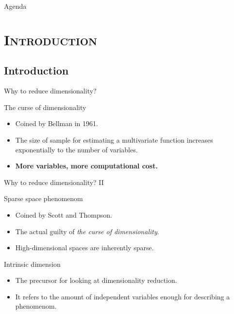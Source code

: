 \documentclass[xcolor=x11names,compress,10pt]{beamer}
\renewcommand{\(}{\begin{columns}}
\renewcommand{\)}{\end{columns}}
\newcommand{\<}[1]{\begin{column}{#1}}
\renewcommand{\>}{\end{column}}
\begin{document}

\begin{frame}{Agenda}
\tableofcontents
\end{frame}


\section{\scshape Introduction}
\subsection{Introduction}
\begin{frame}{Why to reduce dimensionality?}
\begin{block}{The curse of dimensionality}
\begin{itemize}
	\item Coined by Bellman in 1961.
	\item The size of sample for estimating a multivariate function increases exponentially to the number of variables.
	\item \textbf{More variables, more computational cost.}
\end{itemize}
\end{block}

\end{frame}
\begin{frame}{Why to reduce dimensionality? II}
\begin{block}{Sparse space phenomenom}
\begin{itemize}
	\item Coined by Scott and Thompson.
	\item The actual guilty of \emph{the curse of dimensionality}.
	\item High-dimensional spaces are inherently sparse.
\end{itemize}
\end{block}
\begin{block}{Intrinsic dimension}
\begin{itemize}
	\item The precursor for looking at dimensionality reduction.
	\item It refers to the amount of independent variables enough for describing a phenomenom.
\end{itemize}
\end{block}
\end{frame}
\end{document}
